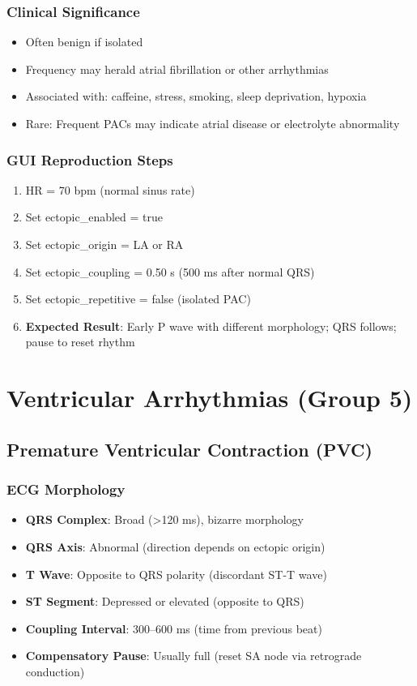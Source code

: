 \documentclass[11pt, a4paper]{article}
\begin{document}
\subsubsection{Clinical Significance}
\begin{itemize}
    \item Often benign if isolated
    \item Frequency may herald atrial fibrillation or other arrhythmias
    \item Associated with: caffeine, stress, smoking, sleep deprivation, hypoxia
    \item Rare: Frequent PACs may indicate atrial disease or electrolyte abnormality
\end{itemize}

\subsubsection{GUI Reproduction Steps}
\begin{enumerate}
    \item HR = 70 bpm (normal sinus rate)
    \item Set ectopic\_enabled = true
    \item Set ectopic\_origin = LA or RA
    \item Set ectopic\_coupling = 0.50 s (500 ms after normal QRS)
    \item Set ectopic\_repetitive = false (isolated PAC)
    \item \textbf{Expected Result}: Early P wave with different morphology; QRS follows; pause to reset rhythm
\end{enumerate}

\section{Ventricular Arrhythmias (Group 5)}

\subsection{Premature Ventricular Contraction (PVC)}

\subsubsection{ECG Morphology}
\begin{itemize}
    \item \textbf{QRS Complex}: Broad (>120 ms), bizarre morphology
    \item \textbf{QRS Axis}: Abnormal (direction depends on ectopic origin)
    \item \textbf{T Wave}: Opposite to QRS polarity (discordant ST-T wave)
    \item \textbf{ST Segment}: Depressed or elevated (opposite to QRS)
    \item \textbf{Coupling Interval}: 300--600 ms (time from previous beat)
    \item \textbf{Compensatory Pause}: Usually full (reset SA node via retrograde conduction)
\end{itemize}
\end{document}
